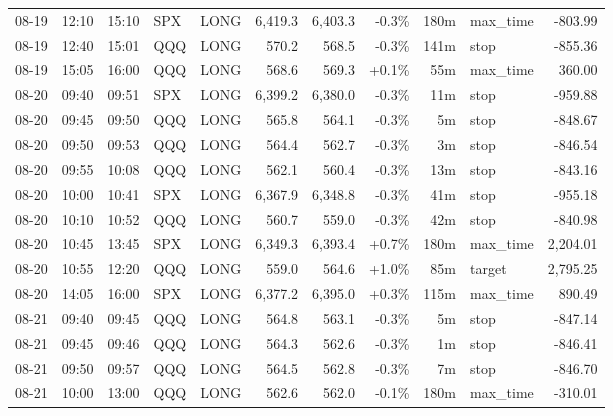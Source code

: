 \documentclass[11pt,a4paper,twoside]{article}
\begin{document}
\begin{center}
\begin{longtable}{>{\color{txtmain}}l l l l l r r r r >{\color{txtmain}}l r}
08-19 & 12:10 & 15:10 & SPX & LONG & 6,419.3 & 6,403.3 & \textcolor{lossred}{-0.3\%} & 180m & max\_time & \textcolor{lossred}{-803.99} \\
08-19 & 12:40 & 15:01 & QQQ & LONG & 570.2 & 568.5 & \textcolor{lossred}{-0.3\%} & 141m & stop & \textcolor{lossred}{-855.36} \\
08-19 & 15:05 & 16:00 & QQQ & LONG & 568.6 & 569.3 & \textcolor{wingreen}{+0.1\%} & 55m & max\_time & \textcolor{wingreen}{360.00} \\
08-20 & 09:40 & 09:51 & SPX & LONG & 6,399.2 & 6,380.0 & \textcolor{lossred}{-0.3\%} & 11m & stop & \textcolor{lossred}{-959.88} \\
08-20 & 09:45 & 09:50 & QQQ & LONG & 565.8 & 564.1 & \textcolor{lossred}{-0.3\%} & 5m & stop & \textcolor{lossred}{-848.67} \\
08-20 & 09:50 & 09:53 & QQQ & LONG & 564.4 & 562.7 & \textcolor{lossred}{-0.3\%} & 3m & stop & \textcolor{lossred}{-846.54} \\
08-20 & 09:55 & 10:08 & QQQ & LONG & 562.1 & 560.4 & \textcolor{lossred}{-0.3\%} & 13m & stop & \textcolor{lossred}{-843.16} \\
08-20 & 10:00 & 10:41 & SPX & LONG & 6,367.9 & 6,348.8 & \textcolor{lossred}{-0.3\%} & 41m & stop & \textcolor{lossred}{-955.18} \\
08-20 & 10:10 & 10:52 & QQQ & LONG & 560.7 & 559.0 & \textcolor{lossred}{-0.3\%} & 42m & stop & \textcolor{lossred}{-840.98} \\
08-20 & 10:45 & 13:45 & SPX & LONG & 6,349.3 & 6,393.4 & \textcolor{wingreen}{+0.7\%} & 180m & max\_time & \textcolor{wingreen}{2,204.01} \\
08-20 & 10:55 & 12:20 & QQQ & LONG & 559.0 & 564.6 & \textcolor{wingreen}{+1.0\%} & 85m & target & \textcolor{wingreen}{2,795.25} \\
08-20 & 14:05 & 16:00 & SPX & LONG & 6,377.2 & 6,395.0 & \textcolor{wingreen}{+0.3\%} & 115m & max\_time & \textcolor{wingreen}{890.49} \\
08-21 & 09:40 & 09:45 & QQQ & LONG & 564.8 & 563.1 & \textcolor{lossred}{-0.3\%} & 5m & stop & \textcolor{lossred}{-847.14} \\
08-21 & 09:45 & 09:46 & QQQ & LONG & 564.3 & 562.6 & \textcolor{lossred}{-0.3\%} & 1m & stop & \textcolor{lossred}{-846.41} \\
08-21 & 09:50 & 09:57 & QQQ & LONG & 564.5 & 562.8 & \textcolor{lossred}{-0.3\%} & 7m & stop & \textcolor{lossred}{-846.70} \\
08-21 & 10:00 & 13:00 & QQQ & LONG & 562.6 & 562.0 & \textcolor{lossred}{-0.1\%} & 180m & max\_time & \textcolor{lossred}{-310.01} \\

\end{longtable}
\end{center}
\end{document}
